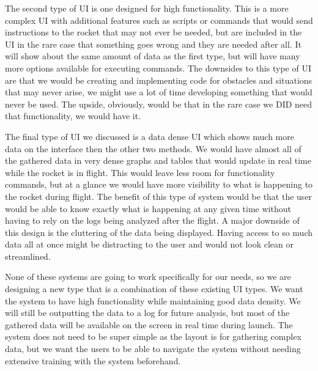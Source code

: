\documentclass[10pt,draftclsnofoot,onecolumn]{IEEEtran}
\begin{document}
	The second type of UI is one designed for high functionality. This is a more complex UI with additional features such as scripts or commands that would send instructions to the rocket that may not ever be needed, but are included in the UI in the rare case that something goes wrong and they are needed after all. It will show about the same amount of data as the first type, but will have many more options available for executing commands. The downsides to this type of UI are that we would be creating and implementing code for obstacles and situations that may never arise, we might use a lot of time developing something that would never be used. The upside, obviously, would be that in the rare case we DID need that functionality, we would have it. \par
	
	The final type of UI we discussed is a data dense UI which shows much more data on the interface then the other two methods. We would have almost all of the gathered data in very dense graphs and tables that would update in real time while the rocket is in flight. This would leave less room for functionality commands, but at a glance we would have more visibility to what is happening to the rocket during flight. The benefit of this type of system would be that the user would be able to know exactly what is happening at any given time without having to rely on the logs being analyzed after the flight. A major downside of this design is the cluttering of the data being displayed. Having access to so much data all at once might be distracting to the user and would not look clean or streamlined. \par

	None of these systems are going to work specifically for our needs, so we are designing a new type that is a combination of these existing UI types. We want the system to have high functionality while maintaining good data density. We will still be outputting the data to a log for future analysis, but most of the gathered data will be available on the screen in real time during launch. The system does not need to be super simple as the layout is for gathering complex data, but we want the users to be able to navigate the system without needing extensive training with the system beforehand. \par
\end{document}
